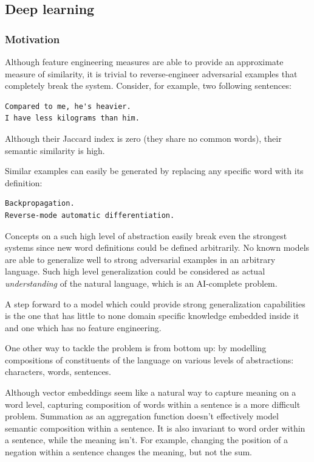 \documentclass[10pt, a4paper]{article}
\begin{document}
\begin{table}[h!]
\subsection{Deep learning}

\subsubsection{Motivation}
Although feature engineering measures are able to provide an approximate measure of similarity, it is trivial to reverse-engineer adversarial examples that completely break the system.
Consider, for example, two following sentences:

\begin{lstlisting}
Compared to me, he's heavier.
I have less kilograms than him.
\end{lstlisting}

Although their Jaccard index is zero (they share no common words), their semantic similarity is high.

Similar examples can easily be generated by replacing any specific word with its definition:
\begin{lstlisting}
Backpropagation.
Reverse-mode automatic differentiation.
\end{lstlisting}

Concepts on a such high level of abstraction easily break even the strongest systems since new word definitions could be defined arbitrarily.
No known models are able to generalize well to strong adversarial examples in an arbitrary language. 
Such high level generalization could be considered as actual \textit{understanding} of the natural language, which is an AI-complete problem.

A step forward to a model which could provide strong generalization capabilities is the one that has little to none domain specific knowledge embedded inside it and one which has no feature engineering.

One other way to tackle the problem is from bottom up: by modelling compositions of constituents of the language on various levels of abstractions: characters, words, sentences.

Although vector embeddings seem like a natural way to capture meaning on a word level, capturing composition of words within a sentence is a more difficult problem.
Summation as an aggregation function doesn't effectively model semantic composition within a sentence.
It is also invariant to word order within a sentence, while the meaning isn't.
For example, changing the position of a negation within a sentence changes the meaning, but not the sum.


\end{table}
\end{document}
